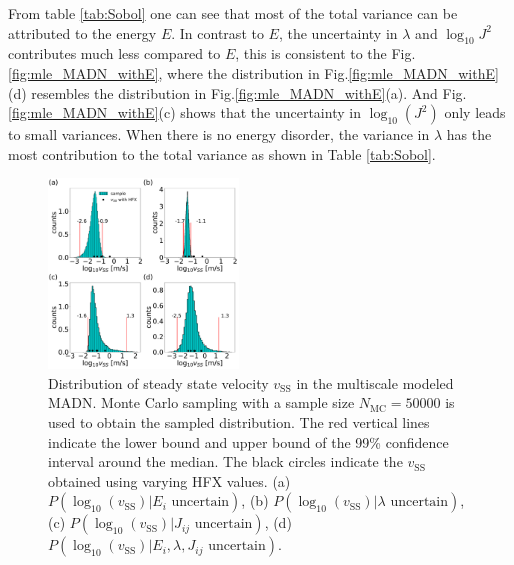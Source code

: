 \documentclass[%
 reprint,
superscriptaddress,
 amsmath,amssymb,
 aps,
prb,
floatfix
]{revtex4-2}
\begin{document}
From table \ref{tab:Sobol} one can see that most of the total variance can be attributed to the energy $E$. In contrast to $E$, the uncertainty in $\lambda$ and $\log_{10} J^2$ contributes much less compared to $E$, this is consistent to the Fig.\ref{fig:mle_MADN_withE}, where the distribution in Fig.\ref{fig:mle_MADN_withE}(d) resembles the distribution in Fig.\ref{fig:mle_MADN_withE}(a).
And Fig.\ref{fig:mle_MADN_withE}(c) shows that the uncertainty in $\log_{10}(J^2)$ only leads to small variances.
When there is no energy disorder, the variance in $\lambda$ has the most contribution to the total variance as shown in Table \ref{tab:Sobol}.

%
\begin{figure}
  \centering
  \includegraphics[width=0.45\textwidth]{figs/fig_mle_MADN_withE_SS.pdf}
  \caption{Distribution of steady state velocity $v_\text{SS}$ in the multiscale modeled MADN.
  Monte Carlo sampling with a sample size $N_\text{MC}=50000$ is used to obtain the sampled distribution.
  The red vertical lines indicate the lower bound and upper bound of the 99\% confidence interval around the median.
  The black circles indicate the $v_\text{SS}$ obtained using varying HFX values.
  (a) $P(\log_{10}(v_\text{SS})|E_i \text{ uncertain})$, 
  (b) $P(\log_{10}(v_\text{SS})|\lambda \text{ uncertain})$, 
  (c) $P(\log_{10}(v_\text{SS})|J_{ij} \text{ uncertain})$, 
  (d) $P(\log_{10}(v_\text{SS})|E_i, \lambda, J_{ij} \text{ uncertain})$. }
  \label{fig:mle_MADN_withE_SS}
\end{figure}
%
%
\end{document}
